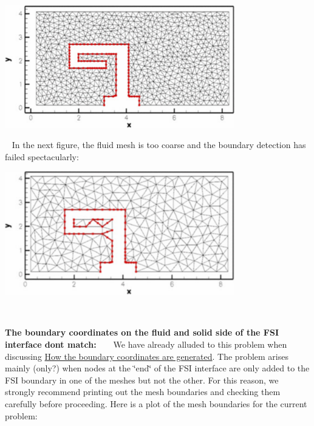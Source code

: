 \begin{DoxyItemize}
\begin{DoxyImage}
\includegraphics[width=0.75\textwidth]{boundary_generation_test}
\end{DoxyImage}
 ~\newline
 In the next figure, the fluid mesh is too coarse and the boundary detection has failed spectacularly\+: ~\newline
~\newline
 
\begin{DoxyImage}
\includegraphics[width=0.75\textwidth]{boundary_generation_test_too_coarse}
\end{DoxyImage}
 ~\newline
~\newline

\item {\bfseries  The boundary coordinates on the fluid and solid side of the F\+SI interface don\textquotesingle{}t match\+:} ~\newline
~\newline
 We have already alluded to this problem when discussing \hyperlink{index_boundary_coord}{How the boundary coordinates are generated}. The problem arises mainly (only?) when nodes at the \char`\"{}end\char`\"{} of the F\+SI interface are only added to the F\+SI boundary in one of the meshes but not the other. For this reason, we strongly recommend printing out the mesh boundaries and checking them carefully before proceeding. Here is a plot of the mesh boundaries for the current problem\+: ~\newline
~\newline
 

\end{DoxyItemize}
